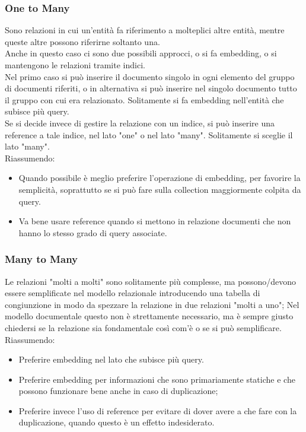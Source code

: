 \subsubsection{One to Many}
Sono relazioni in cui un'entità fa riferimento a molteplici altre entità, mentre queste altre possono riferirne soltanto una.\\
Anche in questo caso ci sono due possibili approcci, o si fa embedding, o si mantengono le relazioni tramite indici.\\
Nel primo caso si può inserire il documento singolo in ogni elemento del gruppo di documenti riferiti, o in alternativa si può inserire nel singolo documento tutto il gruppo con cui era relazionato. Solitamente si fa embedding nell'entità che subisce più query.\\
Se si decide invece di gestire la relazione con un indice, si può inserire una reference a tale indice, nel lato "one" o nel lato "many". Solitamente si sceglie il lato "many".\\
Riassumendo:
\begin{itemize}
    \item Quando possibile è meglio preferire l'operazione di embedding, per favorire la semplicità, soprattutto se si può fare sulla collection maggiormente colpita da query.
    \item Va bene usare reference quando si mettono in relazione documenti che non hanno lo stesso grado di query associate.
\end{itemize}

\subsubsection{Many to Many}
Le relazioni "molti a molti" sono solitamente più complesse, ma possono/devono essere semplificate nel modello relazionale introducendo una tabella di congiunzione in modo da spezzare la relazione in due relazioni "molti a uno";
Nel modello documentale questo non è strettamente necessario, ma è sempre giusto chiedersi se la relazione sia fondamentale così com'è o se si può semplificare.
Riassumendo:
\begin{itemize}
    \item Preferire embedding nel lato che subisce più query.
    \item Preferire embedding per informazioni che sono primariamente statiche e che possono funzionare bene anche in caso di duplicazione;
    \item Preferire invece l'uso di reference per evitare di dover avere a che fare con la duplicazione, quando questo è un effetto indesiderato.
\end{itemize}

